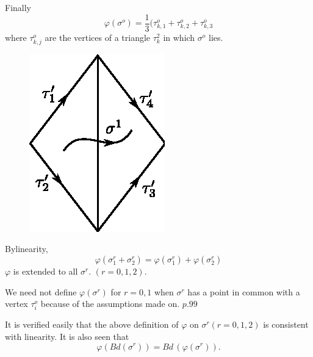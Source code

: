   Finally
  $$
  \varphi (\sigma^o) = \frac{1}{3} (\tau^o_{k, 1} +  \tau^o_{k, 2} + \tau^o_{k, 3}
  $$
  where $\tau^o_{k, j}$ are the vertices of a triangle
  $\tau^2_k$ in 
  which $\sigma^o$ lies.  
    \begin{figure}[H]
    \centerline{\includegraphics{vol9-figures/fig9-13.eps}}
  \end{figure}

By\pageoriginale linearity,
\begin{equation}
  \varphi (\sigma^r_1 + \sigma^r_2) = \varphi (\sigma^r_1) + \varphi
  (\sigma^r_2) \tag{*} 
\end{equation}
$\varphi$ is extended to all $\sigma^r$. $(r = 0, 1, 2)$.

We need not define $\varphi (\sigma^r)$ for $r = 0, 1$ when $\sigma^r$
has a point in common with a vertex $\tau^o_i$ because of the
assumptions made on.  $p. 99$ 
 
It is verified easily that the above definition of $\varphi $ on
$\sigma^r (r = 0, 1, 2)$ is consistent with linearity. It is also seen
that  
 $$
 \varphi (Bd (\sigma^r )) = Bd \,(\varphi (\sigma^r)).
 $$

